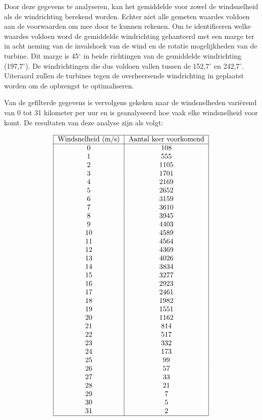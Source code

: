 Door deze gegevens te analyseren, kan het gemiddelde voor zowel de windsnelheid als de windrichting berekend worden. Echter niet alle gemeten waardes voldoen aan de voorwaarden om mee door te kunnen rekenen. Om te identificeren welke waardes voldoen word de gemiddelde windrichting gehanteerd met een marge ter in acht neming van de invalshoek van de wind en de rotatie mogelijkheden van de turbine. Dit marge is 45$^{\circ}$ in beide richtingen van de gemiddelde windrichting (197,7$^{\circ}$). De windrichtingen die dus voldoen vallen tussen de 152,7$^{\circ}$ en 242,7$^{\circ}$. Uiteraard zullen de turbines tegen de overheersende windrichting in geplaatst worden om de opbrengst te optimaliseren.

Van de gefilterde gegevens is vervolgens gekeken naar de windsnelheden variërend van 0 tot 31 kilometer per uur en is geanalyseerd hoe vaak elke windsnelheid voor komt. De resultaten van deze analyse zijn als volgt:

\[
\begin{tabular}{|c|c|}
\hline
Windsnelheid (m/s) & Aantal keer voorkomend \\
\hline
0 & 108 \\
1 & 555 \\
2 & 1105 \\
3 & 1701 \\
4 & 2169 \\
5 & 2652 \\
6 & 3159 \\
7 & 3610 \\
8 & 3945 \\
9 & 4403 \\
10 & 4589 \\
11 & 4564 \\
12 & 4369 \\
13 & 4026 \\
14 & 3834 \\
15 & 3277 \\
16 & 2923 \\
17 & 2461 \\
18 & 1982 \\
19 & 1551 \\
20 & 1162 \\
21 & 814 \\
22 & 517 \\
23 & 332 \\
24 & 173 \\
25 & 99 \\
26 & 57 \\
27 & 33 \\
28 & 21 \\
29 & 7 \\
30 & 5 \\
31 & 2 \\
\hline
\end{tabular}
\]

